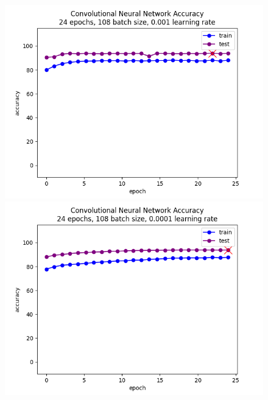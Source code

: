 \documentclass[10pt,twocolumn,letterpaper]{article}
\begin{document}
\begin{figure}[h]
   \begin{center}
       \includegraphics[scale=0.6]{graphs/CNN/higher_learning_rate_accuracies_plot.png}
        \includegraphics[scale=0.6]{graphs/CNN/accuracies_plot.png}
   \end{center}
        \vspace*{-5mm}
        \caption{\label{eigth_figure}}
\end{figure}
\end{document}
